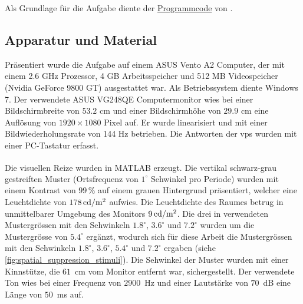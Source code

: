 \documentclass[11pt, twoside, a4paper]{book}		%
\begin{document}
Als Grundlage für die Aufgabe diente der \href{http://www2.bcs.rochester.edu/sites/duje/SuppressionCode.zip}{Programmcode} von \citet{Melnick2013}.

\subsection{Apparatur und Material \label{sub:ssas}}
Präsentiert wurde die Aufgabe auf einem ASUS Vento A2 Computer, der mit einem 2.6 GHz Prozessor, 4 GB Arbeitsspeicher und 512 MB Videospeicher (Nvidia GeForce 9800 GT) ausgestattet war. Als Betriebssystem diente Windows 7. Der verwendete ASUS VG248QE Computermonitor wies bei einer Bildschirmbreite von $53.2$ cm und einer Bildschirmhöhe von $29.9$ cm eine Auflösung von $1920 \times 1080$ Pixel auf. Er wurde linearisiert und mit einer Bildwiederholungsrate von 144 Hz betrieben. Die Antworten der \glspl{vp} wurden mit einer PC-Tastatur erfasst. 

Die visuellen Reize wurden in MATLAB\textsuperscript{\textregistered} \citep{matlab} erzeugt. Die vertikal schwarz-grau gestreiften Muster (Ortsfrequenz von $1^{\circ}$ Sehwinkel pro Periode) wurden mit einem Kontrast von $99\,\%$ auf einem grauen Hintergrund präsentiert, welcher eine Leuchtdichte von $178\,\textnormal{cd}/ \textnormal{m}^2$ aufwies. Die Leuchtdichte des Raumes betrug in unmittelbarer Umgebung des Monitors $9\,\textnormal{cd}/ \textnormal{m}^2$. Die drei in \citet{Melnick2013} verwendeten Mustergrössen mit den Sehwinkeln  $1.8^{\circ}$, $3.6^{\circ}$ und $7.2^{\circ}$ wurden um die Mustergrösse von $5.4^{\circ}$ ergänzt, wodurch sich für diese Arbeit die Mustergrössen mit den Sehwinkeln $1.8^{\circ}$, $3.6^{\circ}$, $5.4^{\circ}$ und $7.2^{\circ}$ ergaben (siehe \autoref{fig:spatial_suppression_stimuli}). 
Die Sehwinkel der Muster wurden mit einer Kinnstütze, die $61$~cm vom Monitor entfernt war, sichergestellt. 
Der verwendete Ton wies bei einer Frequenz von $2900$~Hz und einer Lautstärke von $70$~dB eine Länge von $50$~ms auf.
\end{document}
